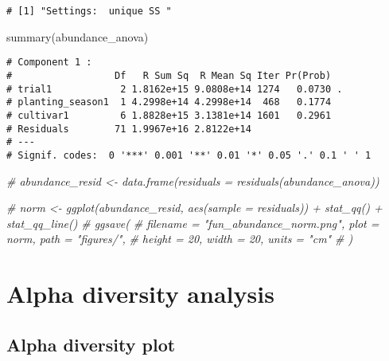 \documentclass[
]{article}
\newenvironment{Shaded}{\begin{snugshade}}{\end{snugshade}}
\newcommand{\CommentTok}[1]{\textcolor[rgb]{0.56,0.35,0.01}{\textit{#1}}}
\newcommand{\FunctionTok}[1]{\textcolor[rgb]{0.00,0.00,0.00}{#1}}
\newcommand{\NormalTok}[1]{#1}
\begin{document}
\begin{verbatim}
# [1] "Settings:  unique SS "
\end{verbatim}

\begin{Shaded}
\begin{Highlighting}[]
\FunctionTok{summary}\NormalTok{(abundance\_anova)}
\end{Highlighting}
\end{Shaded}

\begin{verbatim}
# Component 1 :
#                  Df   R Sum Sq  R Mean Sq Iter Pr(Prob)  
# trial1            2 1.8162e+15 9.0808e+14 1274   0.0730 .
# planting_season1  1 4.2998e+14 4.2998e+14  468   0.1774  
# cultivar1         6 1.8828e+15 3.1381e+14 1601   0.2961  
# Residuals        71 1.9967e+16 2.8122e+14                
# ---
# Signif. codes:  0 '***' 0.001 '**' 0.01 '*' 0.05 '.' 0.1 ' ' 1
\end{verbatim}

\begin{Shaded}
\begin{Highlighting}[]
\CommentTok{\# abundance\_resid \textless{}{-} data.frame(residuals = residuals(abundance\_anova))}

\CommentTok{\# norm \textless{}{-} ggplot(abundance\_resid, aes(sample = residuals)) + stat\_qq() + stat\_qq\_line()}
\CommentTok{\# ggsave(}
\CommentTok{\#   filename = "fun\_abundance\_norm.png", plot = norm, path = "figures/", }
\CommentTok{\#   height = 20, width = 20, units = "cm"}
\CommentTok{\# )}
\end{Highlighting}
\end{Shaded}

\hypertarget{alpha-diversity-analysis}{%
\section{Alpha diversity analysis}\label{alpha-diversity-analysis}}

\hypertarget{alpha-diversity-plot}{%
\subsection{Alpha diversity plot}\label{alpha-diversity-plot}}
\end{document}
